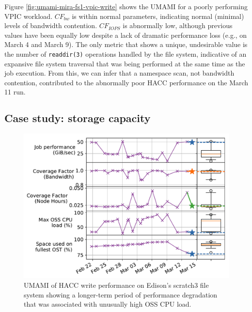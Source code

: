 Figure \ref{fig:umami-mira-fs1-vpic-write} shows the UMAMI for a poorly performing VPIC workload.
$\mathit{CF}_{\mathit{bw}}$ is within normal parameters, indicating normal (minimal) levels of bandwidth contention.
$\mathit{CF}_{\mathit{IOPS}}$ is abnormally low, although previous values have been equally low despite a lack of dramatic performance loss (e.g., on March 4 and March 9).
The only metric that shows a unique, undesirable value is the number of \texttt{readdir(3)} operations handled by the file system, indicative of an expansive file system traversal that was being performed at the same time as the job execution.   From this, we can infer that a namespace scan, not bandwidth contention, contributed to the abnormally poor HACC performance on the March 11 run.

\subsection{Case study: storage capacity}

\begin{figure}[t]
    \centering
    \includegraphics[width=1.0\columnwidth]{figs/umami-scratch3-hacc-write-long-term.pdf}
    \vspace{-.25in}
    \caption{UMAMI of HACC write performance on Edison's scratch3 file system showing a longer-term period of performance degradation that was associated with unusually high OSS CPU load.
    }
    \label{fig:umami-scratch3-hacc-write-long-term}
	\vspace{-.15in}
\end{figure}

